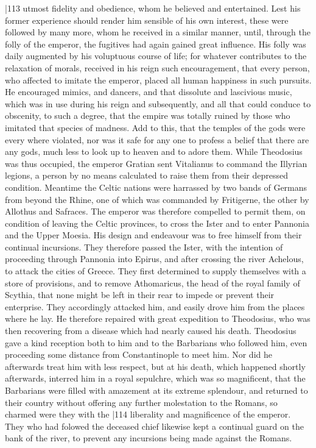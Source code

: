 |113 utmost fidelity and obedience, whom he believed and entertained. Lest his former experience should render him sensible of his own interest, these were followed by many more, whom he received in a similar manner, until, through the folly of the emperor, the fugitives had again gained great influence. His folly was daily augmented by his voluptuous course of life; for whatever contributes to the relaxation of morals, received in his reign such encouragement, that every person, who affected to imitate the emperor, placed all human happiness in such pursuits. He encouraged mimics, and dancers, and that dissolute and lascivious music, which was in use during his reign and subsequently, and all that could conduce to obscenity, to such a degree, that the empire was totally ruined by those who imitated that species of madness. Add to this, that the temples of the gods were every where violated, nor was it safe for any one to profess a belief that there are any gods, much less to look up to heaven and to adore them. While Theodosius was thus occupied, the emperor Gratian sent Vitalianus to command the Illyrian legions, a person by no means calculated to raise them from their depressed condition. Meantime the Celtic nations were harrassed by two bands of Germans from beyond the Rhine, one of which was commanded by Fritigerne, the other by Allothus and Safraces. The emperor was therefore compelled to permit them, on condition of leaving the Celtic provinces, to cross the Ister and to enter Pannonia and the Upper Moesia. His design and endeavour was to free himself from their continual incursions. They therefore passed the Ister, with the intention of proceeding through Pannonia into Epirus, and after crossing the river Achelous, to attack the cities of Greece. They first determined to supply themselves with a store of provisions, and to remove Athomaricus, the head of the royal family of Scythia, that none might be left in their rear to impede or prevent their enterprise. They accordingly attacked him, and easily drove him from the places where he lay. He therefore repaired with great expedition to Theodosius, who was then recovering from a disease which had nearly caused his death. Theodosius gave a kind reception both to him and to the Barbarians who followed him, even proceeding some distance from Constantinople to meet him. Nor did he afterwards treat him with less respect, but at his death, which happened shortly afterwards, interred him in a royal sepulchre, which was so magnificent, that the Barbarians were filled with amazement at its extreme splendour, and returned to their country without offering any further molestation to the Romans, so charmed were they with the
|114
liberality and magnificence of the emperor. They who had folowed the deceased chief likewise kept a continual guard on the bank of the river, to prevent any incursions being made against the Romans.

